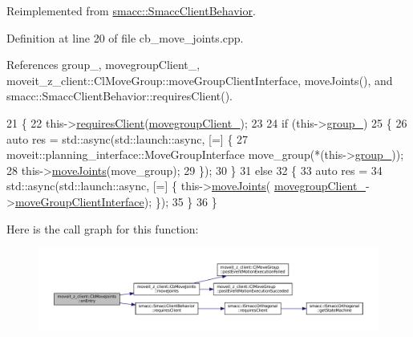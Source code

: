 Reimplemented from \hyperlink{classsmacc_1_1SmaccClientBehavior_a7962382f93987c720ad432fef55b123f}{smacc\+::\+Smacc\+Client\+Behavior}.



Definition at line 20 of file cb\+\_\+move\+\_\+joints.\+cpp.



References group\+\_\+, movegroup\+Client\+\_\+, moveit\+\_\+z\+\_\+client\+::\+Cl\+Move\+Group\+::move\+Group\+Client\+Interface, move\+Joints(), and smacc\+::\+Smacc\+Client\+Behavior\+::requires\+Client().


\begin{DoxyCode}
21 \{
22   this->\hyperlink{classsmacc_1_1SmaccClientBehavior_a917f001e763a1059af337bf4e164f542}{requiresClient}(\hyperlink{classmoveit__z__client_1_1CbMoveJoints_a2ce2e613b676025766dcd2f01ae50810}{movegroupClient\_});
23 
24   \textcolor{keywordflow}{if} (this->\hyperlink{classmoveit__z__client_1_1CbMoveJoints_ac75cb07d2292b2080266c36e4d18fc41}{group\_})
25   \{
26     \textcolor{keyword}{auto} res = std::async(std::launch::async, [=] \{
27       moveit::planning\_interface::MoveGroupInterface move\_group(*(this->\hyperlink{classmoveit__z__client_1_1CbMoveJoints_ac75cb07d2292b2080266c36e4d18fc41}{group\_}));
28       this->\hyperlink{classmoveit__z__client_1_1CbMoveJoints_a4dcc7bcf0ed857d9d580d4700cdeb5db}{moveJoints}(move\_group);
29     \});
30   \}
31   \textcolor{keywordflow}{else}
32   \{
33     \textcolor{keyword}{auto} res =
34         std::async(std::launch::async, [=] \{ this->\hyperlink{classmoveit__z__client_1_1CbMoveJoints_a4dcc7bcf0ed857d9d580d4700cdeb5db}{moveJoints}(
      \hyperlink{classmoveit__z__client_1_1CbMoveJoints_a2ce2e613b676025766dcd2f01ae50810}{movegroupClient\_}->\hyperlink{classmoveit__z__client_1_1ClMoveGroup_af86e046b837be0ef4afa9893d8808f20}{moveGroupClientInterface}); \});
35   \}
36 \}
\end{DoxyCode}
Here is the call graph for this function\+:
\nopagebreak
\begin{figure}[H]
\begin{center}
\leavevmode
\includegraphics[width=350pt]{classmoveit__z__client_1_1CbMoveJoints_a512e97e94ab05ee12837433e5d921095_cgraph}
\end{center}
\end{figure}
\mbox{\label{classmoveit__z__client_1_1CbMoveJoints_a104abb9c8f8ebb04a6e5c8e84b473add}} 
